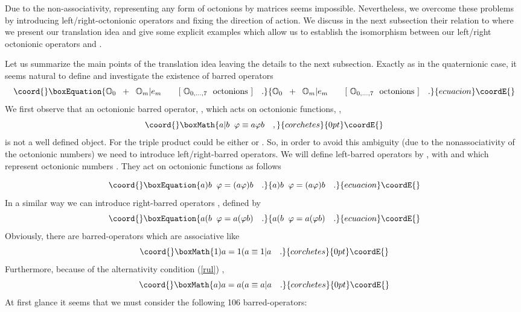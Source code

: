 \documentclass[a4paper,12pt]{book}
\begin{document}
Due to the non-associativity, representing any form of octonions by matrices
seems impossible. Nevertheless, we overcome these problems by introducing
left/right-octonionic operators and fixing the direction of action. We
discuss in the next subsection their relation to \coordHE{} where we
present our translation idea and give some explicit examples which allow us
to establish the isomorphism between our left/right octonionic operators and 
\coordHE{}.

Let us summarize the main points of the translation idea leaving the details
to the next subsection. Exactly as in the quaternionic case, it seems
natural to define and investigate the existence of barred operators 
\begin{equation}\coord{}\boxEquation{
\Bbb{O}_{0}\;\;+\;\;\Bbb{O}_{m}|e_{m}\quad \quad [~\Bbb{O}_{0,...,7}~~
\mbox{octonions}~]\quad .
}{
\Bbb{O}_{0}\;\;+\;\;\Bbb{O}_{m}|e_{m}\quad \quad [~\Bbb{O}_{0,...,7}~~
\mbox{octonions}~]\quad .
}{ecuacion}\coordE{}\end{equation}
We first observe that an octonionic barred operator, \coordHE{}, which acts on
octonionic functions, \myHighlight{$\varphi $}\coordHE{}, 
\[\coord{}\boxMath{
a|b\;\;\varphi \equiv a\varphi b\quad , 
}{corchetes}{0pt}\coordE{}\]
is not a well defined object. For \coordHE{} the triple product \coordHE{}
could be either \coordHE{} or \coordHE{}. So, in order to avoid this
ambiguity (due to the nonassociativity of the octonionic numbers) we need to
introduce left/right-barred operators. We will define left-barred operators
by \coordHE{}, with \coordHE{} and \coordHE{} which represent octonionic numbers \cite{shaeffer}%
\cite{kh2}. They act on octonionic functions \myHighlight{$\varphi $}\coordHE{} as follows

\begin{equation}\coord{}\boxEquation{
a\mathbf{)}b\;\;\varphi =(a\varphi )b\quad .
}{
a\mathbf{)}b\;\;\varphi =(a\varphi )b\quad .
}{ecuacion}\coordE{}\end{equation}
In a similar way we can introduce right-barred operators \coordHE{},
defined by 
\begin{equation}\coord{}\boxEquation{
a\mathbf{(}b\;\;\varphi =a(\varphi b)\quad .
}{
a\mathbf{(}b\;\;\varphi =a(\varphi b)\quad .
}{ecuacion}\coordE{}\end{equation}
Obviously, there are barred-operators which are associative like 
\[\coord{}\boxMath{
1\mathbf{)}a=1\mathbf{(}a\equiv 1|a\quad . 
}{corchetes}{0pt}\coordE{}\]
Furthermore, because of the alternativity condition (\ref{rul}) , 
\[\coord{}\boxMath{
a\mathbf{)}a=a\mathbf{(}a\equiv a|a\quad . 
}{corchetes}{0pt}\coordE{}\]
At first glance it seems that we must consider the following 106
barred-operators:
\end{document}
